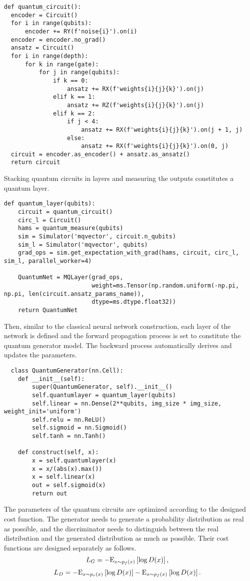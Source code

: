 \begin{lstlisting}
def quantum_circuit():
  encoder = Circuit()
  for i in range(qubits):
      encoder += RY(f'noise{i}').on(i)
  encoder = encoder.no_grad()
  ansatz = Circuit()
  for i in range(depth):
      for k in range(gate):
          for j in range(qubits):
              if k == 0:
                  ansatz += RX(f'weights{i}{j}{k}').on(j)
              elif k == 1:
                  ansatz += RZ(f'weights{i}{j}{k}').on(j)
              elif k == 2:
                  if j < 4:
                      ansatz += RX(f'weights{i}{j}{k}').on(j + 1, j)
                  else:
                      ansatz += RX(f'weights{i}{j}{k}').on(0, j)
  circuit = encoder.as_encoder() + ansatz.as_ansatz()
  return circuit
\end{lstlisting}
Stacking quantum circuits in layers and measuring the outputs constitutes a quantum layer.
\begin{lstlisting}
def quantum_layer(qubits):
    circuit = quantum_circuit()
    circ_l = Circuit()
    hams = quantum_measure(qubits)
    sim = Simulator('mqvector', circuit.n_qubits)
    sim_l = Simulator('mqvector', qubits)
    grad_ops = sim.get_expectation_with_grad(hams, circuit, circ_l, sim_l, parallel_worker=4)

    QuantumNet = MQLayer(grad_ops,
                         weight=ms.Tensor(np.random.uniform(-np.pi, np.pi, len(circuit.ansatz_params_name)),
                         dtype=ms.dtype.float32))
    return QuantumNet
\end{lstlisting}

Then, similar to the classical neural network construction, each layer of the network is defined and the forward propagation process is set to constitute the quantum generator model. The backward process automatically derives and updates the parameters.
\begin{lstlisting}
  class QuantumGenerator(nn.Cell):
    def __init__(self):
        super(QuantumGenerator, self).__init__()
        self.quantumlayer = quantum_layer(qubits)
        self.linear = nn.Dense(2**qubits, img_size * img_size, weight_init='uniform')
        self.relu = nn.ReLU()
        self.sigmoid = nn.Sigmoid()
        self.tanh = nn.Tanh()

    def construct(self, x):
        x = self.quantumlayer(x)
        x = x/(abs(x).max())
        x = self.linear(x)
        out = self.sigmoid(x)
        return out
\end{lstlisting}

The parameters of the quantum circuits are optimized according to the designed cost function. The generator needs to generate a probability distribution as real as possible, and the discriminator needs to distinguish between the real distribution and the generated distribution as much as possible. Their cost functions are designed separately as follows.
\begin{equation}
  {L_G} =  - {{\rm E}_{x\sim{p_f}(x)}}\left[ {\log D(x)} \right],
\end{equation}
\begin{equation}
  {L_D} =  - {{\rm E}_{x\sim{p_r}(x)}}\left[ {\log D(x)} \right] - {{\rm E}_{x\sim{p_f}(x)}}\left[ {\log D(x)} \right].
\end{equation}

